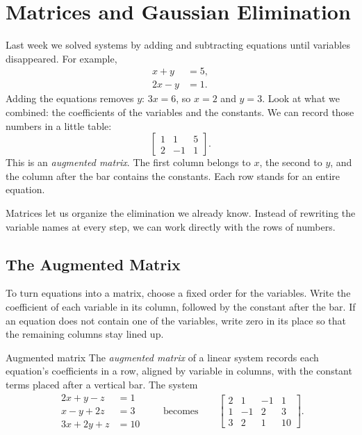 \documentclass[12pt]{book}
\begin{document}
\chapter{Matrices and Gaussian Elimination}

Last week we solved systems by adding and subtracting equations until
variables disappeared. For example,
\[
\begin{aligned}x+y&=5,\\2x-y&=1.\end{aligned}
\]
Adding the equations removes $y$: $3x=6$, so $x=2$ and $y=3$.
Look at what we combined: the coefficients of the variables and
the constants. We can record those numbers in a little table:
\[
\left[\begin{array}{cc|c}1&1&5\\2&-1&1\end{array}\right].
\]
This is an \emph{augmented matrix}. The first column belongs to
$x$, the second to $y$, and the column after the bar contains
the constants. Each row stands for an entire equation.

Matrices let us organize the elimination we already know.
Instead of rewriting the variable names at every step, we can
work directly with the rows of numbers.

\section{The Augmented Matrix}

To turn equations into a matrix, choose a fixed order for the
variables. Write the coefficient of each variable in its column,
followed by the constant after the bar. If an equation does not
contain one of the variables, write zero in its place so that
the remaining columns stay lined up.

\begin{definition}{Augmented matrix}
The \emph{augmented matrix} of a linear system records each equation's coefficients
in a row, aligned by variable in columns, with the constant terms placed after a
vertical bar. The system
\[
\begin{aligned}
2x+y-z&=1\\ x-y+2z&=3\\ 3x+2y+z&=10
\end{aligned}
\qquad\text{becomes}\qquad
\left[\begin{array}{ccc|c}
2&1&-1&1\\ 1&-1&2&3\\ 3&2&1&10
\end{array}\right].
\]
\end{definition}
\end{document}
